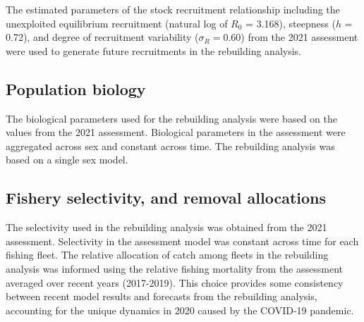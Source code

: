 \documentclass[11pt,
  english,
  a4paper,
]{article}
\begin{document}
\leavevmode\tagmcend\tagstructend


The estimated parameters of the stock recruitment relationship including the unexploited equilibrium recruitment (natural log of {\(R_0\)\leavevmode\tagmcend\tagstructend} = 3.168), steepness ({\(h\)\leavevmode\tagmcend\tagstructend} = 0.72), and degree of recruitment variability ({\(\sigma_R = 0.60\)\leavevmode\tagmcend\tagstructend}) from the 2021 assessment were used to generate future recruitments in the rebuilding analysis.

\leavevmode\tagmcend\tagstructend\par


\hypertarget{population-biology}{%
\subsection{Population biology}\label{population-biology}}

\leavevmode\tagmcend\tagstructend


The biological parameters used for the rebuilding analysis were based on the values from the 2021 assessment. Biological parameters in the assessment were aggregated across sex and constant across time. The rebuilding analysis was based on a single sex model.

\leavevmode\tagmcend\tagstructend\par


\hypertarget{fishery-selectivity-and-removal-allocations}{%
\subsection{Fishery selectivity, and removal allocations}\label{fishery-selectivity-and-removal-allocations}}

\leavevmode\tagmcend\tagstructend


The selectivity used in the rebuilding analysis was obtained from the 2021 assessment. Selectivity in the assessment model was constant across time for each fishing fleet. The relative allocation of catch among fleets in the rebuilding analysis was informed using the relative fishing mortality from the assessment averaged over recent years (2017-2019). This choice provides some consistency between recent model results and forecasts from the rebuilding analysis, accounting for the unique dynamics in 2020 caused by the COVID-19 pandemic.
\end{document}
